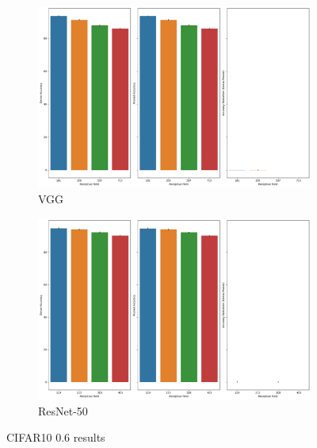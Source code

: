 \begin{figure}[h]
 \centering
     \begin{subfigure}[b]{\columnwidth}
    \includegraphics[width=1.1\columnwidth]{images/Supplementary_material/cifar10_vgg19_pruning_results_0.6.png}
    \caption{VGG}
    \label{subfig:vgg19CIfar10PR0.6}
     \end{subfigure}
      \hfill
     \begin{subfigure}[b]{\columnwidth}
    \includegraphics[width=1.1\columnwidth]{images/Supplementary_material/cifar10_resnet50_pruning_results_0.6.png}
    \caption{ResNet-50}
    \label{subfig:resenet50CIfar10PR0.6}
     \end{subfigure}
     \caption{ CIFAR10 0.6 results}
    \label{fig:pr_0.7_CIFAR10}
\end{figure}


